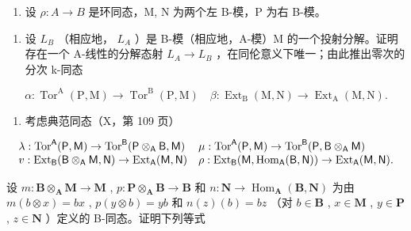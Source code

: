 
\begin{enumerate}
\def\labelenumi{\arabic{enumi})}
\tightlist
\item
  设 \(\rho: A \to B\) 是环同态，M, N 为两个左 B-模，P 为右 B-模。
\end{enumerate}

\begin{enumerate}
\def\labelenumi{\alph{enumi})}
\tightlist
\item
  设 \(L_{B}\) （相应地， \(L_{A}\) ）是 B-模（相应地，A-模）M 的一个投射分解。证明存在一个 A-线性的分解态射 \(L_{A} \rightarrow L_{B}\) ，在同伦意义下唯一；由此推出零次的分次 k-同态
\end{enumerate}

\[
\alpha : \operatorname{Tor} ^ {\mathrm{A}} (\mathrm{P}, \mathrm{M}) \rightarrow \operatorname{Tor} ^ {\mathrm{B}} (\mathrm{P}, \mathrm{M}) \quad \beta : \operatorname{Ext} _ {\mathrm{B}} (\mathrm{M}, \mathrm{N}) \rightarrow \operatorname{Ext} _ {\mathrm{A}} (\mathrm{M}, \mathrm{N}).
\]

\begin{enumerate}
\def\labelenumi{\alph{enumi})}
\setcounter{enumi}{1}
\tightlist
\item
  考虑典范同态（X，第 109 页）
\end{enumerate}

\[
\begin{array}{l l} \lambda : \operatorname{Tor} ^ {\mathsf {A}} (\mathsf {P}, \mathsf {M}) \to \operatorname{Tor} ^ {\mathsf {B}} (\mathsf {P} \otimes_ {\mathsf {A}} \mathsf {B}, \mathsf {M}) & \mu : \operatorname{Tor} ^ {\mathsf {A}} (\mathsf {P}, \mathsf {M}) \to \operatorname{Tor} ^ {\mathsf {B}} (\mathsf {P}, \mathsf {B} \otimes_ {\mathsf {A}} \mathsf {M}) \\ v: \operatorname{Ext} _ {\mathsf {B}} (\mathsf {B} \otimes_ {\mathsf {A}} \mathsf {M}, \mathsf {N}) \to \operatorname{Ext} _ {\mathsf {A}} (\mathsf {M}, \mathsf {N}) & \rho : \operatorname{Ext} _ {\mathsf {B}} (\mathsf {M}, \operatorname{Hom} _ {\mathsf {A}} (\mathsf {B}, \mathsf {N})) \to \operatorname{Ext} _ {\mathsf {A}} (\mathsf {M}, \mathsf {N}). \end{array}
\]

设 \(m: \mathbf{B} \otimes_{\mathbf{A}} \mathbf{M} \to \mathbf{M}\) , \(p: \mathbf{P} \otimes_{\mathbf{A}} \mathbf{B} \to \mathbf{B}\) 和 \(n: \mathbf{N} \to \operatorname{Hom}_{\mathbf{A}}(\mathbf{B}, \mathbf{N})\) 为由 \(m(b \otimes x) = bx\) , \(p(y \otimes b) = yb\) 和 \(n(z)(b) = bz\) （对 \(b \in \mathbf{B}\) , \(x \in \mathbf{M}\) , \(y \in \mathbf{P}\) , \(z \in \mathbf{N}\) ）定义的 B-同态。证明下列等式

